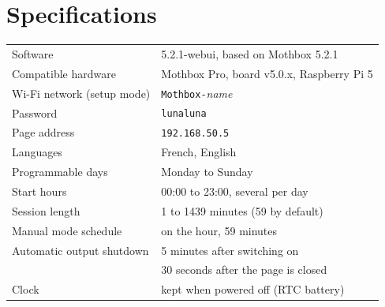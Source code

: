 \documentclass[10pt,a4paper]{article}
\begin{document}
\begin{minipage}[t]{0.43\textwidth}
\vspace{0pt}
\section{Specifications}
\small
\begin{tabularx}{\linewidth}{@{}>{\raggedright\arraybackslash}p{4.2cm}L@{}}
\toprule
Software & 5.2.1-webui, based on Mothbox 5.2.1 \\
Compatible hardware & Mothbox Pro, board v5.0.x, Raspberry Pi 5 \\
\midrule
Wi-Fi network (setup mode) & \texttt{Mothbox-}\textit{name} \\
Password & \texttt{lunaluna} \\
Page address & \texttt{192.168.50.5} \\
Languages & French, English \\
\midrule
Programmable days & Monday to Sunday \\
Start hours & 00:00 to 23:00, several per day \\
Session length & 1 to 1439 minutes (59 by default) \\
Manual mode schedule & on the hour, 59 minutes \\
\midrule
Automatic output shutdown & 5 minutes after switching on \\
 & 30 seconds after the page is closed \\
Clock & kept when powered off (RTC battery) \\
\bottomrule
\end{tabularx}
\end{minipage}
\end{document}
